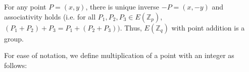 For any point $P = (x,y)$, there is unique inverse $-P = (x, -y)$ and associativity holds (i.e. for all $P_1, P_2, P_3 \in E(\mathbb{Z}_p)$, $(P_1 + P_2) + P_3 = P_1 + (P_2 + P_3))$. Thus, $E(\mathbb{Z}_q)$ with point addition is a group. \cite{katz_introduction_2015}

For ease of notation, we define multiplication of a point with an integer as follows: 

